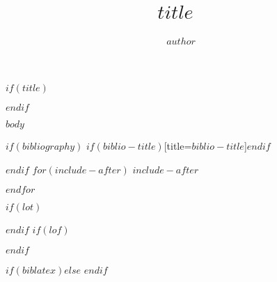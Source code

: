 \documentclass[\pandocDocMode,longtable, floatsintext, noextraspace]{apa6}
\title{$title$}
\title{~}$endif$
\author{$author$}
\affiliation{$course$ $assignment$\\$institute$}
\begin{document}
$if(title)$\maketitle$endif$

$body$

$if(bibliography)$
\printbibliography$if(biblio-title)$[title=$biblio-title$]$endif$

$endif$
$for(include-after)$
$include-after$

$endfor$

$if(lot)$
\listoftables
$endif$
$if(lof)$
\listoffigures
$endif$

$if(biblatex)$$else$
\noindent
\vspace{-2em}
\setlength{\parindent}{-0.5in}
\setlength{\leftskip}{0.5in}
\setlength{\parskip}{15pt}
$endif$
\end{document}
